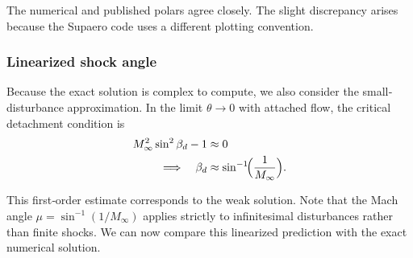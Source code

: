 The numerical and published polars agree closely. The slight discrepancy arises because the Supaero code uses a different plotting convention.

\subsubsection{Linearized shock angle}

Because the exact solution is complex to compute, we also consider the small‐disturbance approximation. In the limit \(\theta \to 0\) with attached flow, the critical detachment condition is
\begin{align}
    M_\infty^2 \sin^2\beta_d - 1 &\approx 0
    \\
    \Longrightarrow\quad \beta_d &\approx \sin^{-1}\!\Bigl(\frac{1}{M_\infty}\Bigr).
\end{align}
\label{eq:beta_d}

This first‐order estimate corresponds to the weak solution. Note that the Mach angle \(\mu = \sin^{-1}(1/M_\infty)\) applies strictly to infinitesimal disturbances rather than finite shocks. We can now compare this linearized prediction with the exact numerical solution.

